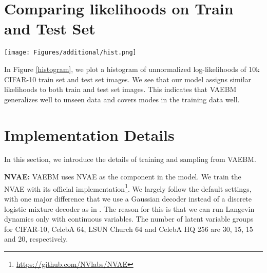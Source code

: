 \documentclass{article} \usepackage{iclr2021_conference,times}
\begin{document}
\section{Comparing likelihoods on Train and Test Set}\label{hist section}
\begin{figure*}[ht]
    \centering
    \texttt{[image: Figures/additional/hist.png]}
    \caption{\label{histogram}
     Histogram of unnormalized log-likelihoods on 10k CIFAR-10 train and test set images}
\end{figure*}

In Figure \ref{histogram}, we plot a histogram of unnormalized log-likelihoods of 10k CIFAR-10 train set and test set images. We see that our model assigns similar likelihoods to both train and test set images. This indicates that VAEBM generalizes well to unseen data and covers modes in the training data well. 



\section{Implementation Details}
\label{setting}
In this section, we introduce the details of training and sampling from VAEBM. 

\textbf{NVAE: } VAEBM uses NVAE as the  component in the model. We train the NVAE with its official implementation\footnote{\url{https://github.com/NVlabs/NVAE}}. We largely follow the default settings, with one major difference that we use a Gaussian decoder instead of a discrete logistic mixture decoder as in \citet{vahdat2020nvae}. The reason for this is that we can run Langevin dynamics only with continuous variables. The number of latent variable groups for CIFAR-10, CelebA 64, LSUN Church 64 and CelebA HQ 256 are 30, 15, 15 and 20, respectively. 
\end{document}
